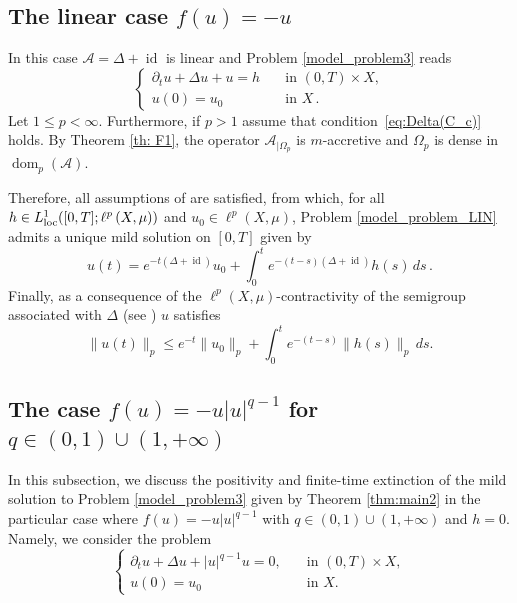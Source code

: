\documentclass[journal]{article}
\theoremstyle{nonitalic}
\theoremstyle{nonitalic}
\theoremstyle{plain} %
\numberwithin{equation}{section}
\newcommand{\dom}{\operatorname{dom}}
\begin{document}
\subsection{The linear case $f(u)=-u$}
In this case ${\mathcal A}=\Delta+\operatorname{id}$ is linear and Problem \eqref{model_problem3} reads
\begin{equation}\label{model_problem_LIN}
	\begin{cases}
		\partial_t u + \Delta u + u= h  &  \quad  \text{in } (0,T)\times X,\\
		u(0) = u_0 & \quad \text{in } X\,.
	\end{cases}
\end{equation}
Let $1\leq p <\infty$. Furthermore, if $p>1$ assume that condition~\eqref{eq:Delta(C_c)} holds. By Theorem \ref{th: F1}, the operator $\mathcal{\mathcal A}_{|\Omega_p}$ is $m$-accretive and $\Omega_p$ is dense in $\dom_p(\mathcal{A})$.  

Therefore, all assumptions of \cite[Theorem 5.7]{benilan1988evolution} are satisfied, from which, for all $h \in L^1_{\rm{loc}}([0,T] ; \ell^p\left(X,\mu\right))$ and  $u_0 \in \ell^p\left(X,\mu\right)$, Problem  \eqref{model_problem_LIN} admits a unique mild solution on $[0,T]$ given by 
 $$u(t)=e^{-t(\Delta+\operatorname{id})}u_0+\int_0^t e^{-(t-s)(\Delta+\operatorname{id})} h(s)\,ds\,.$$
Finally, as a consequence of the $\ell^p(X,\mu)$-contractivity of the semigroup associated with $\Delta$ (see \cite[Theorem 2.9]{keller2021graphs}) $u$ satisfies 
 $$
\|u(t)\|_p \leq e^{-t}\|u_0\|_p + \int_0^t e^{-(t-s)}\|h(s)\|_p\, ds.
$$

 
 

\subsection{The case $f(u) = -u|u|^{q-1}$ for $q\in(0,1) \cup(1,+\infty)$}\label{ssec:extintion_time}
In this subsection, we discuss the positivity and finite-time extinction  of the mild solution to Problem \eqref{model_problem3} given by Theorem \ref{thm:main2} in the particular case where $f(u) = -u|u|^{q-1}$ with $q\in(0,1) \cup(1,+\infty)$ and $h=0$. Namely, we consider the problem 
\begin{equation}\label{model_problem_q}
\begin{cases}
    \partial_t u + \Delta u + |u|^{q-1}u=0, &  \quad  \text{in } (0,T)\times X,\\
    u(0)=u_0 & \quad \text{in } X.
\end{cases}
\end{equation}
\end{document}
